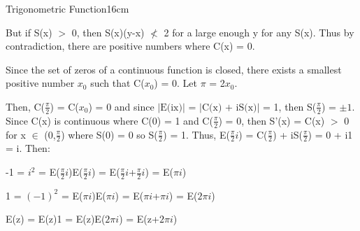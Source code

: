 \begin{definition}{Trigonometric Function}{16cm}
\begin{enumerate}[label=(\alph*), leftmargin=1.5cm, itemsep=0.1cm]
                But if S(x) $>$ 0, then S(x)(y-x) $\not <$ 2 for a large enough
                y for any S(x).
                Thus by contradiction, there are positive numbers where C(x) = 0.
                
                \vspace{0.2cm}

                Since the set of zeros of a continuous function is closed,
                there exists a smallest positive number $x_0$ such that C($x_0$) = 0.
                Let $\pi$ = 2$x_0$.

                Then, C($\frac{\pi}{2}$) = C($x_0$) = 0
                and since $|\text{E(ix)}|$
                = $|\text{C(x) + iS(x)}|$ = 1,
                then S($\frac{\pi}{2}$) = $\pm 1$.
                Since C(x) is continuous where C(0) = 1 and C($\frac{\pi}{2}$) = 0,
                then S'(x) = C(x) $>$ 0 for x $\in$ (0,$\frac{\pi}{2}$)
                where S(0) = 0 so S($\frac{\pi}{2}$) = 1.
                Thus, E($\frac{\pi}{2}i$) = C($\frac{\pi}{2}$) + iS($\frac{\pi}{2}$)
                = 0 + i1 = i. Then:

                \hspace{0.5cm}
                -1 = $i^2$ = E($\frac{\pi}{2}i$)E($\frac{\pi}{2}i$)
                = E($\frac{\pi}{2}i$+$\frac{\pi}{2}i$) = E($\pi i$)

                \hspace{0.5cm}
                1 = $(-1)^2$ = E($\pi i$)E($\pi i$)
                = E($\pi i$+$\pi i$) = E($2\pi i$)

                \hspace{0.5cm}
                E(z) = E(z)1 = E(z)E($2\pi i$) = E(z+$2\pi i$)
        \end{enumerate}
    \end{definition}

    \vspace{0.5cm}



